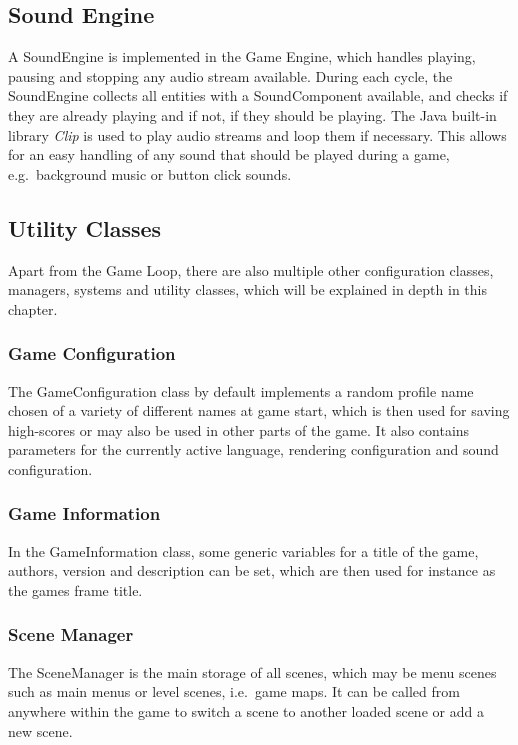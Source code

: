 \subsection{Sound Engine}\label{subsec:sound-engine}
A SoundEngine is implemented in the Game Engine, which handles playing, pausing and stopping any audio stream available.
During each cycle, the SoundEngine collects all entities with a SoundComponent available, and checks if they are already playing and if not, if they should be playing.
The Java built-in library \textit{Clip} is used to play audio streams and loop them if necessary.
This allows for an easy handling of any sound that should be played during a game, e.g.\ background music or button click sounds.

\subsection{Utility Classes}\label{subsec:utility-classes}
Apart from the Game Loop, there are also multiple other configuration classes, managers, systems and utility classes, which will be explained in depth in this chapter.
\subsubsection{Game Configuration}\label{subsubsec:game-configuration}
The GameConfiguration class by default implements a random profile name chosen of a variety of different names at game start, which is then used for saving high-scores
or may also be used in other parts of the game.
It also contains parameters for the currently active language, rendering configuration and sound configuration.

\subsubsection{Game Information}\label{subsubsec:game-information}
In the GameInformation class, some generic variables for a title of the game, authors, version and description can be set, which are then used for instance as the games frame
title.

\subsubsection{Scene Manager}\label{subsubsec:scene-manager}
The SceneManager is the main storage of all scenes, which may be menu scenes such as main menus or level scenes, i.e.\ game maps.
It can be called from anywhere within the game to switch a scene to another loaded scene or add a new scene.

